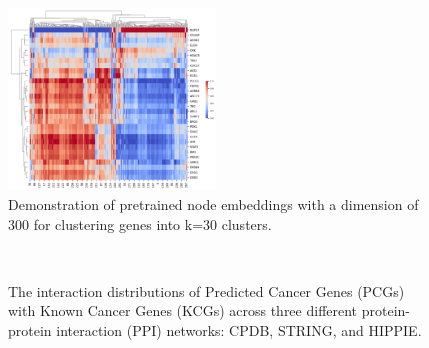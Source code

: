 \begin{figure}
	\centering
	\scriptsize
	\captionsetup{font=scriptsize}
	\includegraphics[width=0.49\textwidth]{images/KIRP_embeddings_matrix_stId_head2_dim16_lay2_epo100_.png}
	\caption{Demonstration of pretrained node embeddings with a dimension of 300 for clustering genes into k=30 clusters.}
	\label{fig:heatmap_clustering}
\end{figure}



\begin{figure}
	\centering
	\scriptsize
	\captionsetup{font=footnotesize}
	\\    
	\caption{The interaction distributions of Predicted Cancer Genes (PCGs) with Known Cancer Genes (KCGs) across three different protein-protein interaction (PPI) networks: CPDB, STRING, and HIPPIE.}
	\label{fig:degree}
\end{figure}

